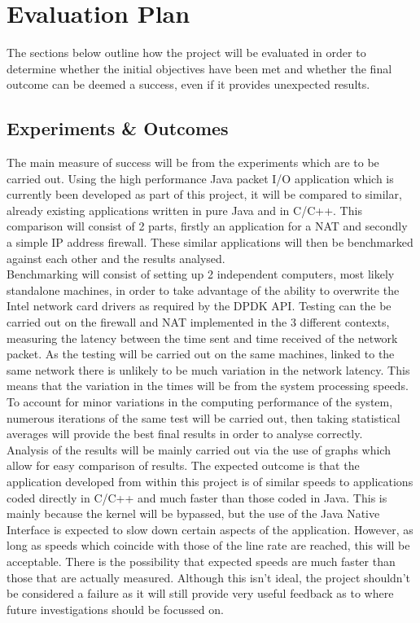 \documentclass[interim_report.tex]{subfiles}
\begin{document}
\section{Evaluation Plan}
The sections below outline how the project will be evaluated in order to determine whether the initial objectives have been met and whether the final outcome can be deemed a success, even if it provides unexpected results.

\subsection{Experiments \& Outcomes}
The main measure of success will be from the experiments which are to be carried out. Using the high performance Java packet I/O application which is currently been developed as part of this project, it will be compared to similar, already existing applications written in pure Java and in C/C++. This comparison will consist of 2 parts, firstly an application for a NAT and secondly a simple IP address firewall. These similar applications will then be benchmarked against each other and the results analysed. \\
\newline
Benchmarking will consist of setting up 2 independent computers, most likely standalone machines, in order to take advantage of the ability to overwrite the Intel network card drivers as required by the DPDK API. Testing can the be carried out on the firewall and NAT implemented in the 3 different contexts, measuring the latency between the time sent and time received of the network packet. As the testing will be carried out on the same machines, linked to the same network there is unlikely to be much variation in the network latency. This means that the variation in the times will be from the system processing speeds. To account for minor variations in the computing performance of the system, numerous iterations of the same test will be carried out, then taking statistical averages will provide the best final results in order to analyse correctly. \\
\newline
Analysis of the results will be mainly carried out via the use of graphs which allow for easy comparison of results. The expected outcome is that the application developed from within this project is of similar speeds to applications coded directly in C/C++ and much faster than those coded in Java. This is mainly because the kernel will be bypassed, but the use of the Java Native Interface is expected to slow down certain aspects of the application. However, as long as speeds which coincide with those of the line rate are reached, this will be acceptable. There is the possibility that expected speeds are much faster than those that are actually measured. Although this isn't ideal, the project shouldn't be considered a failure as it will still provide very useful feedback as to where future investigations should be focussed on.
\end{document}
